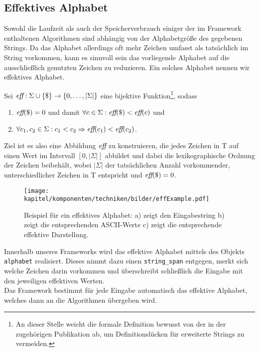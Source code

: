\subsection{Effektives Alphabet}
\label{section:effalphabet}
Sowohl  die Laufzeit als auch der Speicherverbrauch einiger der im Framework enthaltenen Algorithmen sind abhängig von der Alphabetgröße des gegebenen Strings. Da das Alphabet allerdings oft mehr Zeichen umfasst als tatsächlich im String vorkommen, kann es sinnvoll sein das vorliegende Alphabet auf die ausschließlich genutzten Zeichen zu reduzieren. Ein solches Alphabet nennen wir effektives Alphabet.\par
\begin{definition}
	\label{def:effective_alphabet}
	Sei \(\textit{eff} : \Sigma \cup \{\$\} \rightarrow \{0, \ldots, |\Sigma|\}\) eine bijektive Funktion\footnote{\label{differs_from_paper}An dieser Stelle weicht die formale Definition bewusst von der in der zugehörigen Publikation \cite{saca:2} ab, um Definitionslücken für erweiterte Strings zu vermeiden.}, sodass
	\begin{enumerate}
		\item \(\textit{eff}(\$) = 0\) \quad und damit \(\forall c \in \Sigma : \textit{eff}(\$) < \textit{eff}(c)\) und
		\item \(\forall c_1, c_2 \in \Sigma : c_1 < c_2 \Rightarrow \textit{eff}(c_1) < \textit{eff}(c_2)\).
	\end{enumerate}
\end{definition}
Ziel ist es also eine Abbildung $\textit{eff}$ zu konstruieren, die jedes Zeichen in T auf einen Wert im Intervall $[0,|\Sigma|]$ abbildet und dabei die lexikographische Ordnung der Zeichen beibehält, wobei $|\Sigma|$ der tatsächlichen Anzahl vorkommender, unterschiedlicher Zeichen in T entspricht und $\textit{eff}(\$)=0$.\\

\begin{figure}[h]
\centering
\texttt{[image: kapitel/komponenten/techniken/bilder/effExample.pdf]}
\caption{Beispiel für ein effektives Alphabet: a) zeigt den Eingabestring b) zeigt die entsprechenden ASCII-Werte c) zeigt die entsprechende effektive Darstellung.}
\end{figure}
Innerhalb unseres Frameworks wird das effektive Alphabet mittels des Objekts \texttt{alphabet} realisiert. Dieses nimmt dazu einen \texttt{string_span} entgegen, merkt sich welche Zeichen darin vorkommen und überschreibt schließlich die Eingabe mit den jeweiligen effektiven Werten. \\
Das Framework bestimmt für jede Eingabe automatisch das effektive Alphabet, welches dann an die Algorithmen übergeben wird. 
